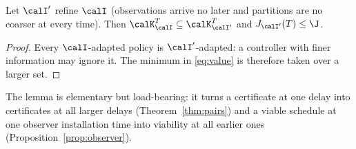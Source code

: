\begin{lemma}\label{lem:mono}
Let $\calI'$ refine $\calI$ (observations arrive no later and partitions are no coarser at every time). Then $\calK^T_\calI\subseteq\calK^T_{\calI'}$ and $J_{\calI'}(T)\le\J$.
\end{lemma}

\begin{proof}
Every $\calI$-adapted policy is $\calI'$-adapted: a controller with finer information may ignore it. The minimum in \eqref{eq:value} is therefore taken over a larger set.
\end{proof}

The lemma is elementary but load-bearing: it turns a certificate at one delay into certificates at all larger delays (Theorem~\ref{thm:pairs}) and a viable schedule at one observer installation time into viability at all earlier ones (Proposition~\ref{prop:observer}).
